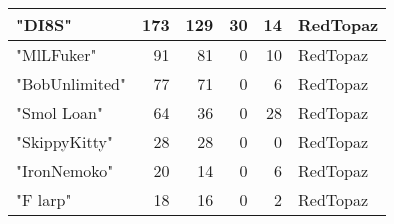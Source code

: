 \documentclass{article}
\begin{document}
\begin{table}[htbp]
\begin{tabular}{|l|r|r|r|r|l|}
"DI8S" & 173 & 129 & 30 & 14 & RedTopaz \\ \hline
"MlLFuker" & 91 & 81 & 0 & 10 & RedTopaz \\ \hline
"BobUnlimited" & 77 & 71 & 0 & 6 & RedTopaz \\ \hline
"Smol Loan" & 64 & 36 & 0 & 28 & RedTopaz \\ \hline
"SkippyKitty" & 28 & 28 & 0 & 0 & RedTopaz \\ \hline
"IronNemoko" & 20 & 14 & 0 & 6 & RedTopaz \\ \hline
"F larp" & 18 & 16 & 0 & 2 & RedTopaz \\ \hline
\end{tabular}
\end{table}
\end{document}
